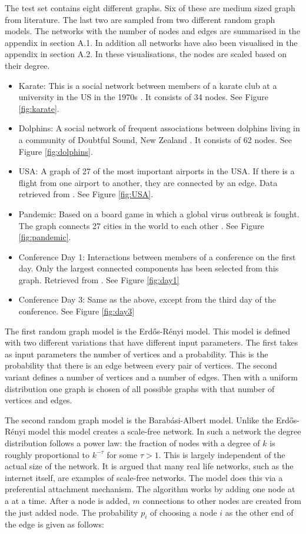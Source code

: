 \documentclass[11pt]{article}
\theoremstyle{definition}
\begin{document}
The test set contains eight different graphs. Six of these are medium sized graph from literature. The last two are sampled from two different random graph models. The networks with the number of nodes and edges are summarised in the appendix in section A.1. In addition all networks have also been visualised in the appendix in section A.2. In these visualisations, the nodes are scaled based on their degree.

\begin{itemize}
    \item Karate: This is a social network between members of a karate club at a university in the US in the 1970s \cite{zachary1977information}. It consists of 34 nodes. See Figure \ref{fig:karate}.
    \item Dolphins: A social network of frequent associations between dolphins living in a community of Doubtful Sound, New Zealand \cite{lusseau2003bottlenose}. It consists of 62 nodes. See Figure \ref{fig:dolphins}.
    \item USA: A graph of 27 of the most important airports in the USA. If there is a flight from one airport to another, they are connected by an edge. Data retrieved from \cite{usaref}. See Figure \ref{fig:USA}.
    \item Pandemic: Based on a board game in which a global virus outbreak is fought. The graph connects 27 cities in the world to each other \cite{pandemicref}. See Figure \ref{fig:pandemic}.
    \item Conference Day 1: Interactions between members of a conference on the first day. Only the largest connected components has been selected from this graph. Retrieved from \cite{confref}. See Figure \ref{fig:day1}
    \item Conference Day 3: Same as the above, except from the third day of the conference. See Figure \ref{fig:day3}
\end{itemize}

The first random graph model is the Erd\H{o}s-R\'enyi model. This model is defined with two different variations that have different input parameters. The first takes as input parameters the number of vertices and a probability. This is the probability that there is an edge between every pair of vertices. The second variant defines a number of vertices and a number of edges. Then with a uniform distribution one graph is chosen of all possible graphs with that number of vertices and edges. 

The second random graph model is the Barab\'asi-Albert model. Unlike the Erd\H{o}s-R\'enyi model this model creates a scale-free network. In such a network the degree distribution follows a power law: the fraction of nodes with a degree of $k$ is roughly proportional to $k^{-\tau}$ for some $\tau > 1$. This is largely independent of the actual size of the network. It is argued that many real life networks, such as the internet itself, are examples of scale-free networks. The model does this via a preferential attachment mechanism. The algorithm works by adding one node at a at a time. After a node is added, $m$ connections to other nodes are created from the just added node. The probability $p_i$ of choosing a node $i$ as the other end of the edge is given as follows: 
\end{document}
